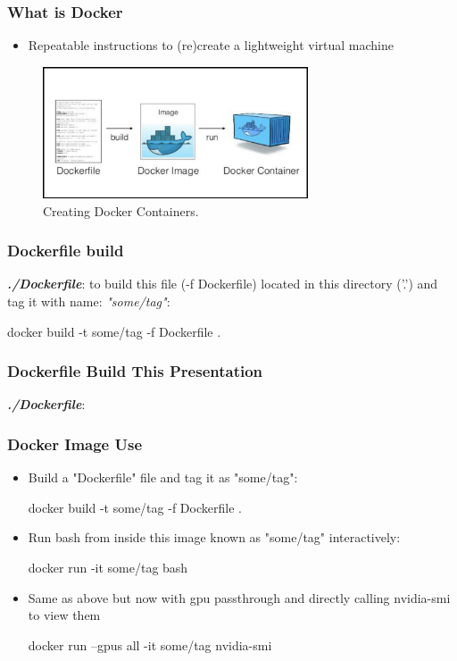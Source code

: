 \documentclass[aspectratio=169]{beamer}
\begin{document}
  \begin{frame}
    \frametitle{What is Docker}
    \begin{itemize}
        \item Repeatable instructions to (re)create a lightweight virtual machine
    \end{itemize}
    \begin{figure}[th!]
      \centering
      \includegraphics[width=0.7\textwidth]{docker_process.png}
      \caption{Creating Docker Containers. \autocite{docker_build}}
      \label{fig:docker_build}
    \end{figure}
  \end{frame}

  \begin{frame}[fragile]
    \frametitle{Dockerfile build}
    \textbf{\textit{./Dockerfile}}:
    to build this file (-f Dockerfile) located in this directory ('.') and tag it with name: \textit{"some/tag"}\autocite{docker}:
    \begin{bashcode}
docker build -t some/tag -f Dockerfile .
    \end{bashcode}
  \end{frame}

  \begin{frame}
    \frametitle{Dockerfile Build This Presentation}
    \textbf{\textit{./Dockerfile}}:
  \end{frame}

  \begin{frame}[fragile]%
    \frametitle{Docker Image Use}
    \begin{itemize}
        \item Build a "Dockerfile" file and  tag it as "some/tag":
        \begin{bashcode}
docker build -t some/tag -f Dockerfile .
        \end{bashcode}
        \item Run bash from inside this image known as "some/tag" interactively:
        \begin{bashcode}
docker run -it some/tag bash
        \end{bashcode}
        \item Same as above but now with gpu passthrough and directly calling nvidia-smi to view them
        \begin{bashcode}
docker run --gpus all -it some/tag nvidia-smi
        \end{bashcode}
    \end{itemize}
  \end{frame}
\end{document}
